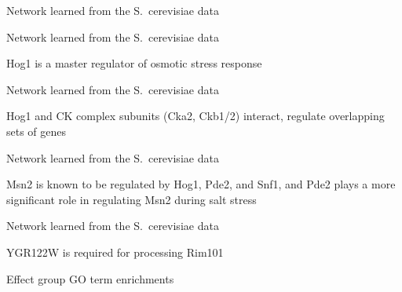 \documentclass[aspectratio=169]{beamer}
\begin{document}

\begin{frame}{}\small  
\end{frame}


\begin{frame}{Network learned from the S.\ cerevisiae data}
\end{frame}


\begin{frame}{Network learned from the S.\ cerevisiae data}

\vfill

Hog1 is a master regulator of osmotic stress response
\end{frame}


\begin{frame}{Network learned from the S.\ cerevisiae data}

\vfill

Hog1 and CK complex subunits (Cka2, Ckb1/2) interact, regulate overlapping sets of genes
\end{frame}


\begin{frame}{Network learned from the S.\ cerevisiae data}

\vfill

Msn2 is known to be regulated by Hog1, Pde2, and Snf1, and Pde2 plays a more significant role in regulating Msn2 during salt stress
\end{frame}


\begin{frame}{Network learned from the S.\ cerevisiae data}

\vfill

YGR122W is required for processing Rim101
\end{frame}


\begin{frame}{Effect group GO term enrichments}
\centering
\end{frame}
\end{document}
